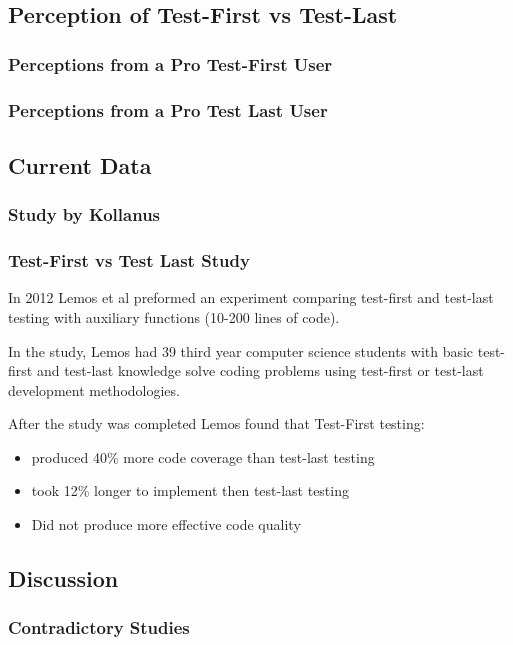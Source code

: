 \documentclass{beamer}
\newcommand{\linespace}{\vskip 0.25cm}
\begin{document}
\subsection{Perception of Test-First vs Test-Last}

\begin{frame}
\frametitle{Perceptions from a Pro Test-First User}
\end{frame}

\begin{frame}
\frametitle{Perceptions from a Pro Test Last User}
\end{frame}


\subsection{Current Data}

\begin{frame}
\frametitle{Study by Kollanus}
\end{frame}

\begin{frame}
\frametitle{Test-First vs Test Last Study}
In 2012 Lemos et al preformed an experiment comparing test-first and test-last testing with auxiliary functions (10-200 lines of code).

\linespace

In the study, Lemos had 39 third year computer science students with basic test-first and test-last knowledge solve coding problems using test-first or test-last development methodologies.

\linespace

After the study was completed Lemos found that Test-First testing:
	\begin{itemize}
		\item produced 40\% more code coverage than test-last testing
		\item took 12\% longer to implement then test-last testing 
		\item Did not produce more effective code quality
	\end{itemize}
\end{frame}

\subsection{Discussion}

\begin{frame}
\frametitle{Contradictory Studies}
\end{frame}
\end{document}
